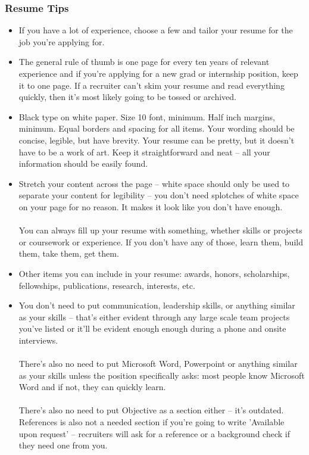 \documentclass{article}
\begin{document}
\subsubsection{Resume Tips}
\begin{itemize}
    \item If you have a lot of experience, choose a few and tailor your resume for the job you're applying for.
    \item The general rule of thumb is one page for every ten years of relevant experience and if you're applying for a new grad or internship position, keep it to one page. If a recruiter can't skim your resume and read everything quickly, then it's most likely going to be tossed or archived.
    \item Black type on white paper. Size 10 font, minimum. Half inch margins, minimum. Equal borders and spacing for all items. Your wording should be concise, legible, but have brevity. Your resume can be pretty, but it doesn't have to be a work of art. Keep it straightforward and neat -- all your information should be easily found.
    \item Stretch your content across the page -- white space should only be used to separate your content for legibility -- you don't need splotches of white space on your page for no reason. It makes it look like you don't have enough. \\\\ You can always fill up your resume with something, whether skills or projects or coursework or experience. If you don't have any of those, learn them, build them, take them, get them. 
    \item Other items you can include in your resume: awards, honors, scholarships, fellowships, publications, research, interests, etc.  
    \item You don't need to put communication, leadership skills, or anything similar as your skills -- that's either evident through any large scale team projects you've listed or it'll be evident enough enough during a phone and onsite interviews. \\\\ There's also no need to put Microsoft Word, Powerpoint or anything similar as your skills unless the position specifically asks: most people know Microsoft Word and if not, they can quickly learn. \\\\
    There's also no need to put Objective as a section either -- it's outdated. References is also not a needed section if you're going to write 'Available upon request' -- recruiters will ask for a reference or a background check if they need one from you. 

\end{itemize}
\end{document}
